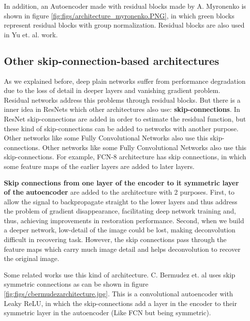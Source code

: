 In addition, an Autoencoder made with residual blocks made by A. Myronenko \cite{myronenko20183d} is shown in figure \ref{fig:figs/architecture_myronenko.PNG}, in which green blocks represent residual blocks with group normalization. Residual blocks are also used in Yu et. al. \cite{learnvolrepreCODE} work. 





\subsection{Other skip-connection-based architectures}

As we explained before, deep plain networks suffer from performance degradation due to the loss of detail in deeper layers and vanishing gradient problem. Residual networks address this problems through residual blocks. But there is a inner idea in ResNets which other architectures also use: \textbf{skip-connections}. In ResNet skip-connections are added in order to estimate the residual function, but these kind of skip-connections can be added to networks with another purpose. Other networks like some Fully Convolutional Networks also use this skip-connections. Other networks like some Fully Convolutional Networks also use this skip-connections. For example, FCN-8 architecture has skip connections, in which some feature maps of the earlier layers are added to later layers.

\textbf{Skip connections from one layer of the encoder to it symmetric layer of the autoencoder} are added to the architecture with 2 purposes. First, to allow the signal to backpropagate straight to the lower layers and thus address the problem of gradient disappearance, facilitating deep network training and, thus, achieving improvements in restoration performance. Second, when we build a deeper network, low-detail of the image could be lost, making deconvolution difficult in recovering task. However, the skip connections pass through the feature maps which carry much image detail and helps deconvolution to recover the original image. 

Some related works use this kind of architecture. C. Bermudez et. al \cite{bermudez2018t1autoencoder} uses skip symmetric connections as can be shown in figure \ref{fig:figs/cbermudezarchitecture.jpg}. This is a convolutional autoencoder with Leaky ReLU, in which the skip-connections add a layer in the encoder to their symmetric layer in the autoencoder (Like FCN but being symmetric).

